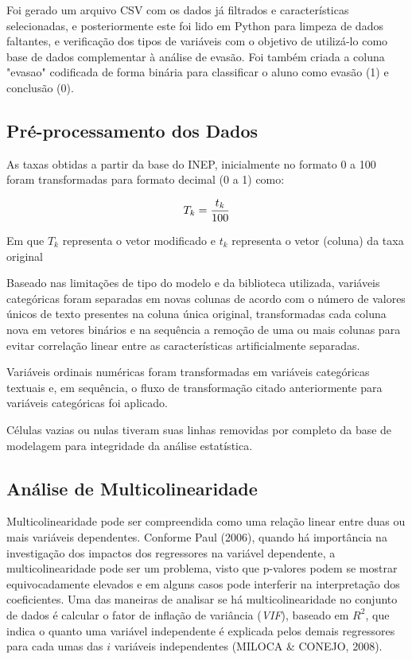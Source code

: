 \documentclass[english, spanish, brazilian]{RBIEarticle} %
\begin{document}
Foi gerado um arquivo CSV com os dados já filtrados e características selecionadas, e posteriormente este foi lido em Python para limpeza de dados faltantes, e verificação dos tipos de variáveis com o objetivo de utilizá-lo como base de dados complementar à análise de evasão. Foi também criada a coluna "evasao" codificada de forma binária para classificar o aluno como evasão (1) e conclusão (0).


\subsection{Pré-processamento dos Dados}
As taxas obtidas a partir da base do INEP, inicialmente no formato 0 a 100 foram transformadas para formato decimal (0 a 1) como:

\vspace{0.5cm}
\begin{equation}
\large T_k = \frac{t_k}{100}
\end{equation}
\vspace{0.5cm}

Em que $T_k$ representa o vetor modificado e $t_k$ representa o vetor (coluna) da taxa original

Baseado nas limitações de tipo do modelo e da biblioteca utilizada, variáveis categóricas foram separadas em novas colunas de acordo com o número de valores únicos de texto presentes na coluna única original, transformadas cada coluna nova em vetores binários e na sequência a remoção de uma ou mais colunas para evitar correlação linear entre as características artificialmente separadas.  

Variáveis ordinais numéricas foram transformadas em variáveis categóricas textuais e, em sequência, o fluxo de transformação citado anteriormente para variáveis categóricas foi aplicado.

Células vazias ou nulas tiveram suas linhas removidas por completo da base de modelagem para integridade da análise estatística.

\subsection{Análise de Multicolinearidade}
Multicolinearidade pode ser compreendida como uma relação linear entre duas ou mais variáveis dependentes. Conforme Paul (2006), quando há importância na investigação dos impactos dos regressores na variável dependente, a multicolinearidade pode ser um problema, visto que p-valores podem se mostrar equivocadamente elevados e em alguns casos pode interferir na interpretação dos coeficientes. Uma das maneiras de analisar se há multicolinearidade no conjunto de dados é calcular o fator de inflação de variância (\textit{VIF}), baseado em $R^2$, que indica o quanto uma variável independente é explicada pelos demais regressores para cada umas das $i$ variáveis independentes (MILOCA \& CONEJO, 2008).
\end{document}

